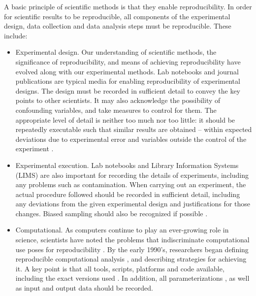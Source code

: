 A basic principle of scientific methods is that they enable reproducibility.  
In order for scientific results to be reproducible, all components of the 
experimental design, data collection and data analysis steps must be 
reproducible.  These include:
\begin{itemize}

  \item Experimental design.  Our understanding of scientific methods, the 
  significance of reproducibility, and means of achieving reproducibility 
  have evolved along with our experimental methods.  Lab notebooks and journal 
  publications are typical media for enabling reproducibility of experimental 
  designs.  
  The design must be recorded in sufficient detail to convey the key
  points to other scientists.  It may also acknowledge the possibility of 
  confounding variables, and take measures to control for them.
  The appropriate level of detail is neither too much nor too little:
  it should be repeatedly executable such that similar results are obtained 
  -- within expected deviations due to experimental error and variables 
  outside the control of the experiment \cite{drummond2012reproducible}.

  \item Experimental execution.  Lab notebooks and Library Information Systems 
  (LIMS) are also important for recording the details of experiments, including 
  any problems such as contamination.
  When carrying out an experiment, the actual procedure followed should be
  recorded in sufficient detail, including any deviations from the given 
  experimental design and justifications for those changes.
  Biased sampling should also be recognized if possible
  \cite{savovic2012influence, simmons2011false}.

  \item Computational.  As computers continue to play an ever-growing role in 
  science, scientists have noted the problems that indiscriminate computational 
  use poses for reproducibility \cite{donoho2009, peng2011reproducible}.  
  By the early 1990's, researchers began defining reproducible 
  computational analysis \cite{donoho_wavelab}, and describing strategies for 
  achieving it.  A key point is that all tools, scripts, platforms and code 
  available, including the exact versions used
   \cite{ince2012open, nekrutenko2012next, blankenberg2014dissemination}.
  In addition, all parameterizations \cite{landis2012call}, as well
  as input and output data should be recorded.


\end{itemize}
